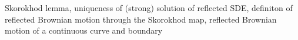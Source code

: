 Skorokhod lemma, uniqueness of (strong) solution of reflected SDE, definiton of reflected Brownian motion through the Skorokhod map, reflected Brownian motion of a continuous curve and boundary